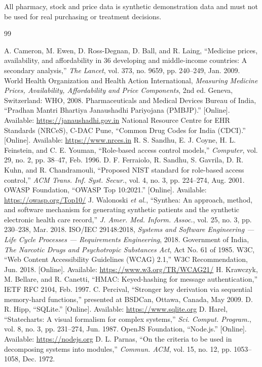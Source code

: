 \documentclass[11pt,a4paper]{article}
\begin{document}
\noindent All pharmacy, stock and price data is synthetic demonstration data and must not be used for real purchasing or treatment decisions.

\begin{thebibliography}{99}
 A. Cameron, M. Ewen, D. Ross-Degnan, D. Ball, and R. Laing, ``Medicine prices, availability, and affordability in 36 developing and middle-income countries: A secondary analysis,'' \textit{The Lancet}, vol. 373, no. 9659, pp. 240--249, Jan. 2009.
 World Health Organization and Health Action International, \textit{Measuring Medicine Prices, Availability, Affordability and Price Components}, 2nd ed. Geneva, Switzerland: WHO, 2008.
 Pharmaceuticals and Medical Devices Bureau of India, ``Pradhan Mantri Bhartiya Janaushadhi Pariyojana (PMBJP).'' [Online]. Available: \url{https://janaushadhi.gov.in}
 National Resource Centre for EHR Standards (NRCeS), C-DAC Pune, ``Common Drug Codes for India (CDCI).'' [Online]. Available: \url{https://www.nrces.in}
 R. S. Sandhu, E. J. Coyne, H. L. Feinstein, and C. E. Youman, ``Role-based access control models,'' \textit{Computer}, vol. 29, no. 2, pp. 38--47, Feb. 1996.
 D. F. Ferraiolo, R. Sandhu, S. Gavrila, D. R. Kuhn, and R. Chandramouli, ``Proposed NIST standard for role-based access control,'' \textit{ACM Trans. Inf. Syst. Secur.}, vol. 4, no. 3, pp. 224--274, Aug. 2001.
 OWASP Foundation, ``OWASP Top 10:2021.'' [Online]. Available: \url{https://owasp.org/Top10/}
 J. Walonoski \textit{et al.}, ``Synthea: An approach, method, and software mechanism for generating synthetic patients and the synthetic electronic health care record,'' \textit{J. Amer. Med. Inform. Assoc.}, vol. 25, no. 3, pp. 230--238, Mar. 2018.
 ISO/IEC 29148:2018, \textit{Systems and Software Engineering --- Life Cycle Processes --- Requirements Engineering}, 2018.
 Government of India, \textit{The Narcotic Drugs and Psychotropic Substances Act}, Act No. 61 of 1985.
 W3C, ``Web Content Accessibility Guidelines (WCAG) 2.1,'' W3C Recommendation, Jun. 2018. [Online]. Available: \url{https://www.w3.org/TR/WCAG21/}
 H. Krawczyk, M. Bellare, and R. Canetti, ``HMAC: Keyed-hashing for message authentication,'' IETF RFC 2104, Feb. 1997.
 C. Percival, ``Stronger key derivation via sequential memory-hard functions,'' presented at BSDCan, Ottawa, Canada, May 2009.
 D. R. Hipp, ``SQLite.'' [Online]. Available: \url{https://www.sqlite.org}
 D. Harel, ``Statecharts: A visual formalism for complex systems,'' \textit{Sci. Comput. Program.}, vol. 8, no. 3, pp. 231--274, Jun. 1987.
 OpenJS Foundation, ``Node.js.'' [Online]. Available: \url{https://nodejs.org}
 D. L. Parnas, ``On the criteria to be used in decomposing systems into modules,'' \textit{Commun. ACM}, vol. 15, no. 12, pp. 1053--1058, Dec. 1972.
\end{thebibliography}
\end{document}
